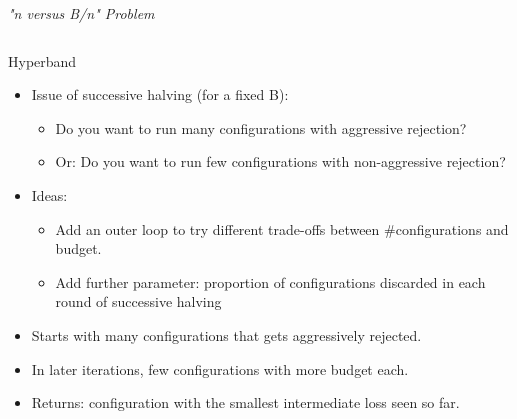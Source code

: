 \begin{frame}{\emph{"n versus B/n" Problem}}
\begin{columns}
\begin{column}{.45\linewidth}

\end{column}
    
\end{columns}
    
\end{frame}

\begin{frame}{Hyperband}
\begin{itemize}
    \item Issue of successive halving (for a fixed B):
    \begin{itemize}
        \item Do you want to run many configurations with aggressive rejection?
        \item Or: Do you want to run few configurations with non-aggressive rejection?
    \end{itemize}
    \item Ideas:
    \begin{itemize}
        \item Add an outer loop to try different trade-offs between $\#$configurations and budget.
        \item Add further parameter: proportion of configurations discarded in each round of successive halving
    \end{itemize}
    \item Starts with many configurations that gets aggressively rejected.
    \item In later iterations, few configurations with more budget each.
    \item Returns: configuration with the smallest intermediate loss seen so far.
\end{itemize}
\end{frame}


